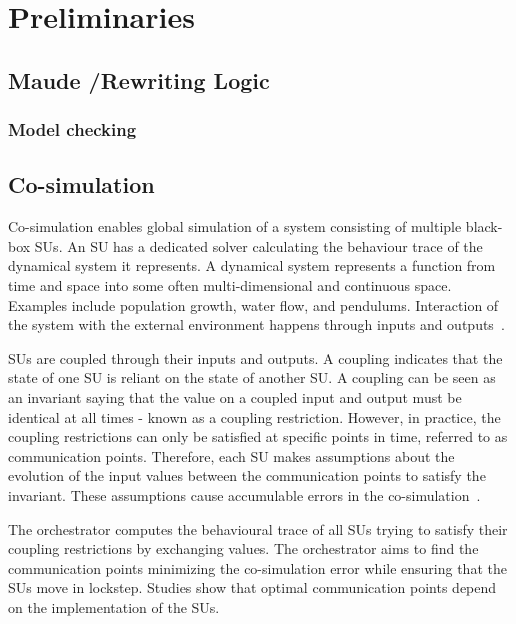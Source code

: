 \section{Preliminaries}\label{sc:background}
\subsection{Maude /Rewriting Logic}

\subsubsection{Model checking}


\subsection{Co-simulation}
Co-simulation enables global simulation of a system consisting of multiple black-box SUs. 
An SU has a dedicated solver calculating the behaviour trace of the dynamical system it represents. 
A dynamical system represents a function from time and space into some often multi-dimensional and continuous space. 
Examples include population growth, water flow, and pendulums. 
Interaction of the system with the external environment happens through inputs and outputs~\cite{Gomes2019a,Kubler2000}.

SUs are coupled through their inputs and outputs.
A coupling indicates that the state of one SU is reliant on the state of another SU.
A coupling can be seen as an invariant saying that the value on a coupled input and output must be identical at all times - known as a coupling restriction. 
However, in practice, the coupling restrictions can only be satisfied at specific points in time, referred to as communication points. 
Therefore, each SU makes assumptions about the evolution of the input values between the communication points to satisfy the invariant.
These assumptions cause accumulable errors in the co-simulation~\cite{Arnold2014}.

The orchestrator computes the behavioural trace of all SUs trying to satisfy their coupling restrictions by exchanging values. 
The orchestrator aims to find the communication points minimizing the co-simulation error while ensuring that the SUs move in lockstep. 
Studies \cite{Gomes2019,Oakes2021,Gomes2018f,Schweizer2015c,Gomes2018a} show that optimal communication points depend on the implementation of the SUs.

